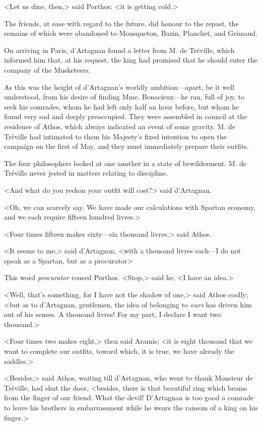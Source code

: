 <Let us dine, then,> said Porthos; <it is getting cold.> 

The friends, at ease with regard to the future, did honour to the repast, the remains of which were abandoned to Mousqueton, Bazin, Planchet, and Grimaud. 

On arriving in Paris, d'Artagnan found a letter from M. de Tréville, which informed him that, at his request, the king had promised that he should enter the company of the Musketeers. 

As this was the height of d'Artagnan's worldly ambition---apart, be it well understood, from his desire of finding Mme. Bonacieux---he ran, full of joy, to seek his comrades, whom he had left only half an hour before, but whom he found very sad and deeply preoccupied. They were assembled in council at the residence of Athos, which always indicated an event of some gravity. M. de Tréville had intimated to them his Majesty's fixed intention to open the campaign on the first of May, and they must immediately prepare their outfits. 

The four philosophers looked at one another in a state of bewilderment. M. de Tréville never jested in matters relating to discipline. 

<And what do you reckon your outfit will cost?> said d'Artagnan. 

<Oh, we can scarcely say. We have made our calculations with Spartan economy, and we each require fifteen hundred livres.> 

<Four times fifteen makes sixty---six thousand livres,> said Athos. 

<It seems to me,> said d'Artagnan, <with a thousand livres each---I do not speak as a Spartan, but as a procurator\longdash> 

This word \textit{procurator} roused Porthos. <Stop,> said he, <I have an idea.> 

<Well, that's something, for I have not the shadow of one,> said Athos coolly; <but as to d'Artagnan, gentlemen, the idea of belonging to \textit{ours} has driven him out of his senses. A thousand livres! For my part, I declare I want two thousand.> 

<Four times two makes eight,> then said Aramis; <it is eight thousand that we want to complete our outfits, toward which, it is true, we have already the saddles.> 

<Besides,> said Athos, waiting till d'Artagnan, who went to thank Monsieur de Tréville, had shut the door, <besides, there is that beautiful ring which beams from the finger of our friend. What the devil! D'Artagnan is too good a comrade to leave his brothers in embarrassment while he wears the ransom of a king on his finger.> 